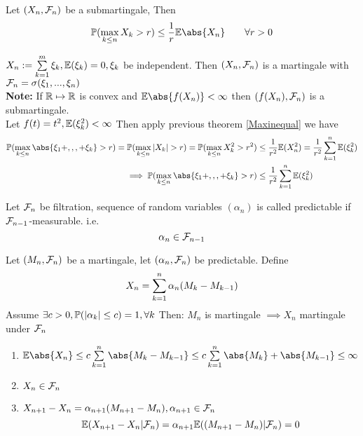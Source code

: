 \begin{thm}
\label{Maxinequal}
Let $(X_n, \mathcal{F}_n)$ be a submartingale, Then
\begin{equation*}
    \prob(\max\limits_{k\leq n} X_k > r) \leq \frac{1}{r} \E\abs{X_n} \qquad \forall r>0
\end{equation*}
\end{thm}
\pf \vspace{10cm}
\begin{example}
$X_n := \sum\limits_{k=1}^m \xi_k, \mathbb{E}(\xi_k) = 0, \xi_k$ be independent. Then $(X_n, \mathcal{F}_n)$ is a martingale with $\mathcal{F}_n = \sigma(\xi_1, ..., \xi_n)$ \\
\textbf{Note: } If $\mathbb{R} \mapsto \mathbb{R}$ is convex and $\E\abs{f(X_n)} < \infty$ then $(f(X_n), \mathcal{F}_n)$ is a submartingale. \\
Let $f(t) = t^2, \mathbb{E}(\xi_k^2)<\infty$ Then apply previous theorem \ref{Maxinequal} we have 
\begin{align*}
    \prob(\max\limits_{k\leq n} \abs{\xi_1 + ,,, + \xi_k} > r) = \prob(\max\limits_{k\leq n} |X_k| > r) = \prob(\max\limits_{k\leq n} X_k^2 > r^2) &\leq \frac{1}{r^2}\E(X_n^2) = \frac{1}{r^2}\bigs{k=1}^n \E(\xi_k^2) \\
    \implies \prob(\max\limits_{k\leq n} \abs{\xi_1 + ,,, + \xi_k} > r) &\leq \frac{1}{r^2}\bigs{k=1}^n \E(\xi_k^2)
\end{align*}
\end{example}

\newpage
\begin{dfn}[Predictable] Let $\mathcal{F}_n$ be filtration, sequence of random variables $(\alpha_n)$ is called predictable if  $\mathcal{F}_{n-1}$-measurable. i.e.
\begin{equation*}
    \alpha_n \in \mathcal{F}_{n-1}
\end{equation*}
\end{dfn}
\begin{example}
Let $(M_n, \mathcal{F}_n)$ be a martingale, let $(\alpha_n, \mathcal{F}_n)$ be predictable. Define \begin{equation*}
    X_n = \sum\limits_{k=1}^n \alpha_n (M_k - M_{k-1})
\end{equation*}Assume $\exists c >0, \mathbb{P}(|\alpha_k| \leq c) = 1, \forall k$ Then: $M_n$ is martingale $\implies X_n$ martingale under $\mathcal{F}_n$
\begin{enumerate}
    \item $\E\abs{X_n} \leq c\bigs{k=1}^n \abs{M_k - M_{k-1}} \leq c\bigs{k=1}^n \abs{M_k}+ \abs{M_{k-1}} \leq \infty$
    \item $X_n\in\mathcal{F}_n$
    \item $X_{n+1}-X_n = \alpha_{n+1}(M_{n+1}-M_n), \alpha_{n+1}\in\mathcal{F}_n$
    \begin{equation*}
        \mathbb{E}(X_{n+1}-X_n|\mathcal{F}_n) = \alpha_{n+1}\mathbb{E}((M_{n+1}-M_n) |\mathcal{F}_n) = 0
    \end{equation*}
\end{enumerate}

\end{example}
\newpage
